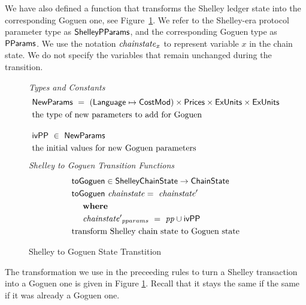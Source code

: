 We have also defined a function that transforms the Shelley ledger state into
the corresponding Goguen one, see Figure~\ref{fig:functions:to-shelley}. We
refer to the Shelley-era protocol parameter type as $\mathsf{ShelleyPParams}$, and the corresponding Goguen
type as $\mathsf{PParams}$. We use the notation $\mathit{chainstate}_{x}$ to represent
variable $x$ in the chain state. We do not specify the variables that
remain unchanged during the transition.

\begin{figure}[htb]
  \emph{Types and Constants}
  \begin{align*}
      & \NewParams ~=~ (\Language \mapsto \CostMod) \times \Prices \times \ExUnits \times \ExUnits \\
      & \text{the type of new parameters to add for Goguen}
      \nextdef
      & \mathsf{ivPP} ~\in~ \NewParams \\
      & \text{the initial values for new Goguen parameters}
  \end{align*}
  \emph{Shelley to Goguen Transition Functions}
  \begin{align*}
      & \mathsf{toGoguen} \in \mathsf{ShelleyChainState} \to \mathsf{ChainState} \\
      & \mathsf{toGoguen}~\mathit{chainstate} =~\mathit{chainstate'} \\
      &~~~ ~ \mathbf{where}~ ~  \\
      &~~~~\mathit{chainstate'}_{pparams}~=~\mathit{pp}\cup \mathsf{ivPP}\\
      & \text{transform Shelley chain state to Goguen state}
  \end{align*}
  \caption{Shelley to Goguen State Transtition}
  \label{fig:functions:to-shelley}
\end{figure}

The transformation we use in the preceeding rules to turn a Shelley
transaction into a Goguen one is given in Figure
\ref{fig:functions:to-shelley}. Recall that it stays the same if the same
if it was already a Goguen one.

